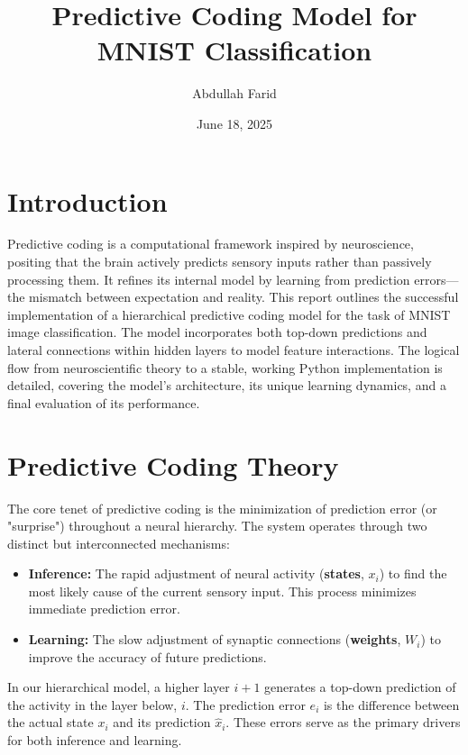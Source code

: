 \documentclass[a4paper,12pt]{article}
\begin{document}
\title{Predictive Coding Model for MNIST Classification}
\author{Abdullah Farid}
\date{June 18, 2025}
\maketitle

\section{Introduction}
Predictive coding is a computational framework inspired by neuroscience, positing that the brain actively predicts sensory inputs rather than passively processing them. It refines its internal model by learning from prediction errors—the mismatch between expectation and reality. This report outlines the successful implementation of a hierarchical predictive coding model for the task of MNIST image classification. The model incorporates both top-down predictions and lateral connections within hidden layers to model feature interactions. The logical flow from neuroscientific theory to a stable, working Python implementation is detailed, covering the model's architecture, its unique learning dynamics, and a final evaluation of its performance.

\section{Predictive Coding Theory}
The core tenet of predictive coding is the minimization of prediction error (or "surprise") throughout a neural hierarchy. The system operates through two distinct but interconnected mechanisms:

\begin{itemize}
    \item \textbf{Inference:} The rapid adjustment of neural activity (\textbf{states}, $x_i$) to find the most likely cause of the current sensory input. This process minimizes immediate prediction error.
    \item \textbf{Learning:} The slow adjustment of synaptic connections (\textbf{weights}, $W_i$) to improve the accuracy of future predictions.
\end{itemize}

In our hierarchical model, a higher layer $i+1$ generates a top-down prediction of the activity in the layer below, $i$. The prediction error $e_i$ is the difference between the actual state $x_i$ and its prediction $\hat{x}_i$. These errors serve as the primary drivers for both inference and learning.
\end{document}
